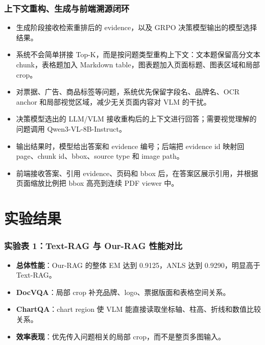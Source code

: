 \documentclass[AutoFakeBold,AutoFakeSlant]{beamer}
\begin{document}
\begin{frame}
  \frametitle{上下文重构、生成与前端溯源闭环}
  \small
  \begin{itemize}
    \item 生成阶段接收检索重排后的 evidence，以及 GRPO 决策模型输出的模型选择结果。
    \item 系统不会简单拼接 Top-K，而是按问题类型重构上下文：文本题保留高分文本 chunk，表格题加入 Markdown table，图表题加入页面标题、图表区域和局部 crop。
    \item 对票据、广告、商品标签等问题，系统优先保留字段名、品牌名、OCR anchor 和局部视觉区域，减少无关页面内容对 VLM 的干扰。
    \item 决策模型选出的 LLM/VLM 接收重构后的上下文进行回答；需要视觉理解的问题调用 Qwen3-VL-8B-Instruct。
    \item 输出结果时，模型给出答案和 evidence 编号；后端把 evidence id 映射回 page、chunk id、bbox、source type 和 image path。
    \item 前端接收答案、引用 evidence、页码和 bbox 后，在答案区展示引用，并根据页面缩放比例把 bbox 高亮到连续 PDF viewer 中。
  \end{itemize}
\end{frame}

\section{实验结果}

\begin{frame}
  \frametitle{实验表 1：Text-RAG 与 Our-RAG 性能对比}
  \scriptsize
  \vspace{0.2cm}

  \begin{itemize}
    \item \textbf{总体性能}：Our-RAG 的整体 EM 达到 0.9125，ANLS 达到 0.9290，明显高于 Text-RAG。
    \item \textbf{DocVQA}：局部 crop 补充品牌、logo、票据版面和表格空间关系。
    \item \textbf{ChartQA}：chart region 使 VLM 能直接读取坐标轴、柱高、折线和数值比较关系。
    \item \textbf{效率表现}：优先传入问题相关的局部 crop，而不是整页多图输入。
  \end{itemize}
\end{frame}
\end{document}
